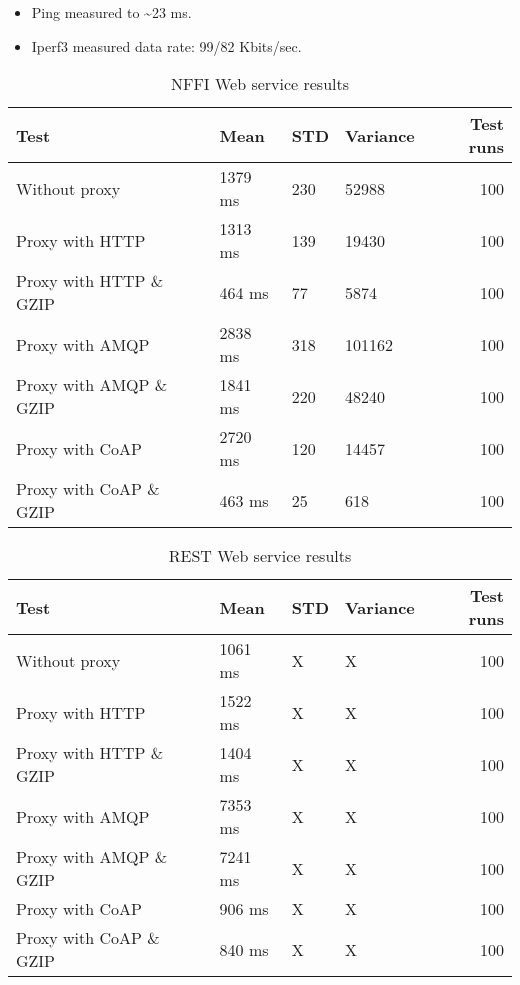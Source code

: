 \begin{appendices}
\begin{itemize}
	\item Ping measured to \textasciitilde 23 ms.
	\item Iperf3 measured data rate: 99/82 Kbits/sec.
\end{itemize}

\begin{table}[H]
\begin{tabular}{llllr}
\hline
 Test                   &   Mean &   STD &   Variance &   Test runs \\
\hline
  Without proxy & 1379 ms & 230 & 52988 & 100 \\
  Proxy with HTTP & 1313 ms & 139 & 19430 & 100 \\
  Proxy with HTTP \& GZIP & 464 ms & 77 & 5874 & 100 \\
  Proxy with AMQP & 2838 ms & 318 & 101162 & 100 \\
  Proxy with AMQP \& GZIP & 1841 ms & 220 & 48240 & 100\\
  Proxy with CoAP & 2720 ms & 120 & 14457 & 100 \\
  Proxy with CoAP \& GZIP & 463 ms & 25 & 618 & 100 \\
\end{tabular}
\caption{NFFI Web service results}
\end{table}


\begin{table}[H]
\begin{tabular}{llllr}
\hline
 Test                   &   Mean &   STD  &   Variance &   Test runs \\
\hline
  Without proxy & 1061 ms & X & X & 100 \\
  Proxy with HTTP & 1522 ms & X & X & 100 \\
  Proxy with HTTP \& GZIP & 1404 ms & X & X & 100 \\
  Proxy with AMQP & 7353 ms & X & X & 100 \\
  Proxy with AMQP \& GZIP & 7241 ms & X & X & 100\\
  Proxy with CoAP & 906 ms & X & X & 100 \\
  Proxy with CoAP \& GZIP & 840 ms & X & X & 100 \\
\end{tabular}
\caption{REST Web service results}
\end{table}



\end{appendices}
